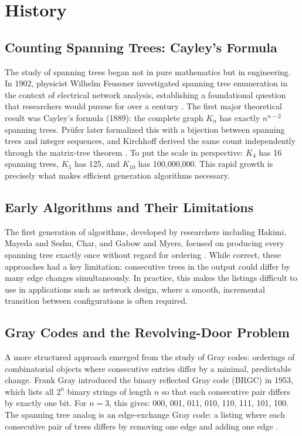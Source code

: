\documentclass{article}
\begin{document}
\section{History}

\subsection{Counting Spanning Trees: Cayley's Formula}

The study of spanning trees began not in pure mathematics but in engineering. In 1902,
physicist Wilhelm Feussner investigated spanning tree enumeration in the context of
electrical network analysis, establishing a foundational question that researchers would
pursue for over a century \cite{liu2026}. The first major theoretical result was
Cayley's formula (1889): the complete graph $K_n$ has exactly $n^{n-2}$ spanning trees.
Pr\"{u}fer later formalized this with a bijection between spanning trees and integer
sequences, and Kirchhoff derived the same count independently through the matrix-tree
theorem \cite{liu2026}. To put the scale in perspective: $K_4$ has 16 spanning trees,
$K_5$ has 125, and $K_{10}$ has 100{,}000{,}000. This rapid growth is precisely what
makes efficient generation algorithms necessary.

\subsection{Early Algorithms and Their Limitations}

The first generation of algorithms, developed by researchers including Hakimi, Mayeda
and Seshu, Char, and Gabow and Myers, focused on producing every spanning tree exactly
once without regard for ordering \cite{liu2026}. While correct, these approaches had a
key limitation: consecutive trees in the output could differ by many edge changes
simultaneously. In practice, this makes the listings difficult to use in applications
such as network design, where a smooth, incremental transition between configurations
is often required.

\subsection{Gray Codes and the Revolving-Door Problem}

A more structured approach emerged from the study of Gray codes: orderings of
combinatorial objects where consecutive entries differ by a minimal, predictable change.
Frank Gray introduced the binary reflected Gray code (BRGC) in 1953, which lists all
$2^n$ binary strings of length $n$ so that each consecutive pair differs by exactly one
bit. For $n = 3$, this gives: 000, 001, 011, 010, 110, 111, 101, 100. The spanning
tree analog is an edge-exchange Gray code: a listing where each consecutive pair of
trees differs by removing one edge and adding one edge \cite{liu2026}.
\end{document}
